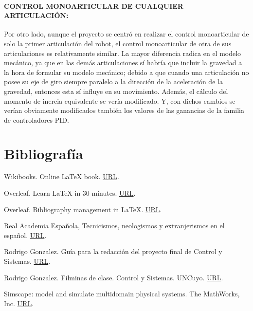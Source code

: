 \documentclass{article}
\begin{document}
\begin{sloppypar}
\paragraph{CONTROL MONOARTICULAR DE CUALQUIER ARTICULACIÓN:}
\label{sec:CONTROL MONOARTICULAR DE CUALQUIER ARTICULACIÓN:}
\hfill

Por otro lado, aunque el proyecto se centró en realizar el control monoarticular de solo la primer articulación del robot, el control monoarticular de otra de sus articulaciones es relativamente similar. La mayor diferencia radica en el modelo mecánico, ya que en las demás articulaciones sí habría que incluir la gravedad a la hora de formular su modelo mecánico; debido a que cuando una articulación no posee su eje de giro siempre paralelo a la dirección de la aceleración de la gravedad, entonces esta sí influye en su movimiento. Además, el cálculo del momento de inercia equivalente se vería modificado. Y, con dichos cambios se verían obviamente modificados también los valores de las ganancias de la familia de controladores PID.








\section*{Bibliografía}

Wikibooks. Online \LaTeX{} book.
\href{https://en.wikibooks.org/wiki/LaTeX/}{URL}.

Overleaf. Learn LaTeX in 30 minutes.
\href{https://www.overleaf.com/learn/latex/Learn_LaTeX_in_30_minutes}{URL}.

Overleaf. Bibliography management in LaTeX.
\href{https://www.overleaf.com/learn/latex/Bibliography_management_in_LaTeX}{URL}.

Real Academia Española, Tecnicismos, neologismos y extranjerismos en el español.
\href{http://revistas.rae.es/bilrae/article/view/218/525}{URL}.

Rodrigo Gonzalez. Guía para la redacción del proyecto final de Control y Sistemas.
\href{https://es.overleaf.com/project/5ce7209e973f0d6ead24dcef}{URL}.

Rodrigo Gonzalez. Filminas de clase. Control y Sistemas. UNCuyo.
\href{https://github.com/rodralez/control}{URL}.

Simscape: model and simulate multidomain physical systems. The MathWorks, Inc.
\href{https://la.mathworks.com/products/simscape.html}{URL}.


\end{sloppypar}
\end{document}
